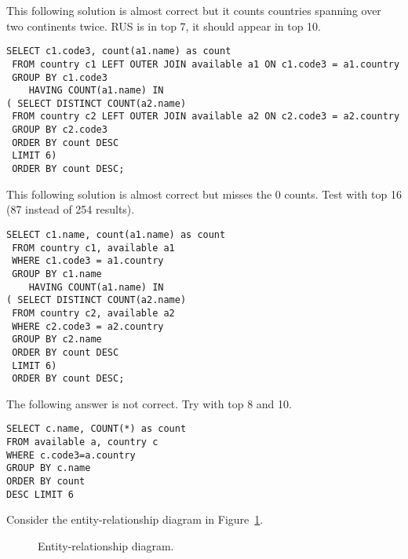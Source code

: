 \documentclass[10pt,a4paper,answers]{exam}
\begin{document}
\begin{questions}
\begin{parts}
\begin{solution}
This following solution is almost correct but it counts countries spanning over two continents twice. RUS is in top 7, it should appear in top 10. 
\begin{lstlisting}
SELECT c1.code3, count(a1.name) as count
 FROM country c1 LEFT OUTER JOIN available a1 ON c1.code3 = a1.country
 GROUP BY c1.code3
 	HAVING COUNT(a1.name) IN
( SELECT DISTINCT COUNT(a2.name) 
 FROM country c2 LEFT OUTER JOIN available a2 ON c2.code3 = a2.country
 GROUP BY c2.code3
 ORDER BY count DESC
 LIMIT 6)
 ORDER BY count DESC;
\end{lstlisting}
This following solution is almost correct but misses the 0 counts. Test with top 16 (87 instead of 254 results).
\begin{lstlisting}
SELECT c1.name, count(a1.name) as count
 FROM country c1, available a1
 WHERE c1.code3 = a1.country
 GROUP BY c1.name
 	HAVING COUNT(a1.name) IN
( SELECT DISTINCT COUNT(a2.name) 
 FROM country c2, available a2 
 WHERE c2.code3 = a2.country
 GROUP BY c2.name
 ORDER BY count DESC
 LIMIT 6)
 ORDER BY count DESC;
\end{lstlisting}

The following answer is not correct. Try with top 8 and 10.
\begin{lstlisting}
SELECT c.name, COUNT(*) as count 
FROM available a, country c
WHERE c.code3=a.country
GROUP BY c.name
ORDER BY count 
DESC LIMIT 6
\end{lstlisting}
\end{solution}
\end{parts}


\pagebreak
\question\label{ques:er} Consider the  entity-relationship diagram in Figure~\ref{fig:er}.


\begin{figure}
\begin{center}
\caption{Entity-relationship diagram.}
\label{fig:er}
\end{center}
\end{figure}
\end{questions}
\end{document}
